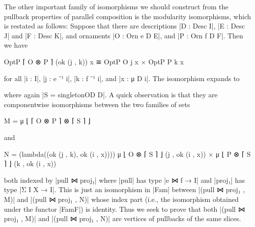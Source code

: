 The other important family of isomorphisms we should construct from the pullback properties of parallel composition is the modularity isomorphisms, which is restated as follows:
Suppose that there are descriptions |D : Desc I|, |E : Desc J| and |F : Desc K|, and ornaments |O : Orn e D E|, and |P : Orn f D F|.
Then we have
\begin{code}
OptP ⌈ O ⊗ P ⌉ (ok (j , k)) x ≅ OptP O j x × OptP P k x
\end{code}
for all |i : I|, |j : e ⁻¹ i|, |k : f ⁻¹ i|, and |x : μ D i|.
The isomorphism expands to
where again |S = singletonOD D|.
A quick observation is that they are componentwise isomorphisms between the two families of sets
\savecolumns
\begin{code}
M  =  μ ⌊ ⌈ O ⊗ P ⌉ ⊗ ⌈ S ⌉ ⌋
\end{code}
and
\restorecolumns
\begin{code}
N  =  (lambda((ok (j , k), ok (i , x))))
        μ ⌊ O  ⊗ ⌈ S ⌉ ⌋ (j ,  ok (i , x)) × μ ⌊ P  ⊗ ⌈ S ⌉ ⌋ (k ,  ok (i , x))
\end{code}
both indexed by |pull ⋈ proj₁| where |pull| has type |e ⋈ f → I| and |proj₁| has type |Σ I X → I|.
This is just an isomorphism in |Fam| between |(pull ⋈ proj₁ , M)| and |(pull ⋈ proj₁ , N)| whose index part (i.e., the isomorphism obtained under the functor |FamF|) is identity.
Thus we seek to prove that both |(pull ⋈ proj₁ , M)| and |(pull ⋈ proj₁ , N)| are vertices of pullbacks of the same slices.


